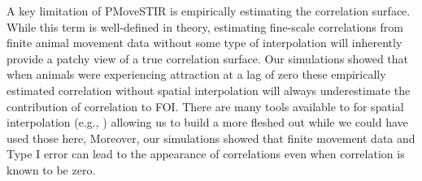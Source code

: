 \documentclass[letterpaper]{article}
\begin{document}
A key limitation of PMoveSTIR is empirically estimating the correlation surface.  While this term is well-defined in theory, estimating fine-scale correlations from finite animal movement data without some type of interpolation will inherently provide a patchy view of a true correlation surface.  Our simulations showed that when animals were experiencing attraction at a lag of zero these empirically estimated correlation without spatial interpolation will always underestimate the contribution of correlation to FOI. There are many tools available to for spatial interpolation (e.g., ) allowing us to build a more fleshed out  while we could have used those here,   Moreover, our simulations showed that finite movement data and Type I error can lead to the appearance of correlations even when correlation is known to be zero.  

\end{document}

